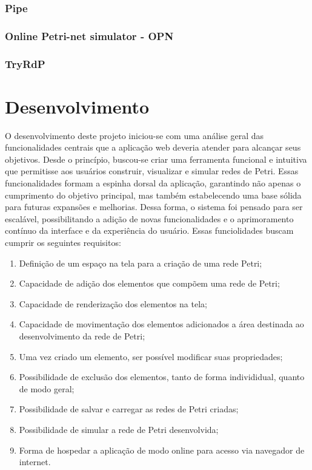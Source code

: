 \documentclass[
	12pt,				%
	openright,			%
	oneside,			%
	a4paper,			%
	english,			%
	brazil				%
	]{abntex2}
\begin{document}
\subsection*{Pipe}

\subsection*{Online Petri-net simulator - OPN}

\subsection*{TryRdP}

\chapter{Desenvolvimento} \label{cap:desenvolvimento}

O desenvolvimento deste projeto iniciou-se com uma análise geral das funcionalidades centrais que a aplicação web deveria atender para alcançar seus objetivos. Desde o princípio, buscou-se criar uma ferramenta funcional e intuitiva que permitisse aos usuários construir, visualizar e simular redes de Petri. Essas funcionalidades formam a espinha dorsal da aplicação, garantindo não apenas o cumprimento do objetivo principal, mas também estabelecendo uma base sólida para futuras expansões e melhorias. Dessa forma, o sistema foi pensado para ser escalável, possibilitando a adição de novas funcionalidades e o aprimoramento contínuo da interface e da experiência do usuário. Essas funciolidades buscam cumprir os seguintes requisitos: 

\begin{enumerate}
	\item Definição de um espaço na tela para a criação de uma rede Petri;
	\item Capacidade de adição dos elementos que compõem uma rede de Petri;
	\item Capacidade de renderização dos elementos na tela;
	\item Capacidade de movimentação dos elementos adicionados a área destinada ao desenvolvimento da rede de Petri;
	\item Uma vez criado um elemento, ser possível modificar suas propriedades;
	\item Possibilidade de exclusão dos elementos, tanto de forma individidual, quanto de modo geral;
	\item Possibilidade de salvar e carregar as redes de Petri criadas;
	\item Possibilidade de simular a rede de Petri desenvolvida;
	\item Forma de hospedar a aplicação de modo online para acesso via navegador de internet.
\end{enumerate}
\end{document}
